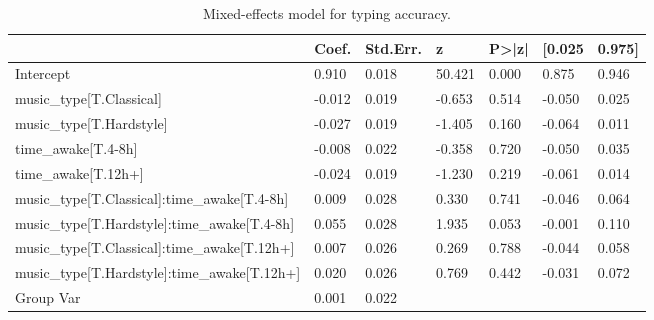 
        \begin{table}[htbp]
            \centering
            \caption{Mixed-effects model for typing accuracy.}
            \label{tab:acc}
            \footnotesize
            \begin{tabular}{lllllll}
\toprule
 & Coef. & Std.Err. & z & P>|z| & [0.025 & 0.975] \\
\midrule
Intercept & 0.910 & 0.018 & 50.421 & 0.000 & 0.875 & 0.946 \\
music_type[T.Classical] & -0.012 & 0.019 & -0.653 & 0.514 & -0.050 & 0.025 \\
music_type[T.Hardstyle] & -0.027 & 0.019 & -1.405 & 0.160 & -0.064 & 0.011 \\
time_awake[T.4-8h] & -0.008 & 0.022 & -0.358 & 0.720 & -0.050 & 0.035 \\
time_awake[T.12h+] & -0.024 & 0.019 & -1.230 & 0.219 & -0.061 & 0.014 \\
music_type[T.Classical]:time_awake[T.4-8h] & 0.009 & 0.028 & 0.330 & 0.741 & -0.046 & 0.064 \\
music_type[T.Hardstyle]:time_awake[T.4-8h] & 0.055 & 0.028 & 1.935 & 0.053 & -0.001 & 0.110 \\
music_type[T.Classical]:time_awake[T.12h+] & 0.007 & 0.026 & 0.269 & 0.788 & -0.044 & 0.058 \\
music_type[T.Hardstyle]:time_awake[T.12h+] & 0.020 & 0.026 & 0.769 & 0.442 & -0.031 & 0.072 \\
Group Var & 0.001 & 0.022 &  &  &  &  \\
\bottomrule
\end{tabular}

        \end{table}
